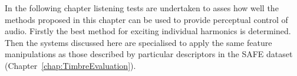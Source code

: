 	In the following chapter listening tests are undertaken to asses how well the methods proposed in this chapter can
	be used to provide perceptual control of audio. Firstly the best method for exciting individual harmonics is
	determined. Then the systems discussed here are specialised to apply the same feature manipulations as those
	described by particular descriptors in the SAFE dataset (Chapter~\ref{chap:TimbreEvaluation}).
